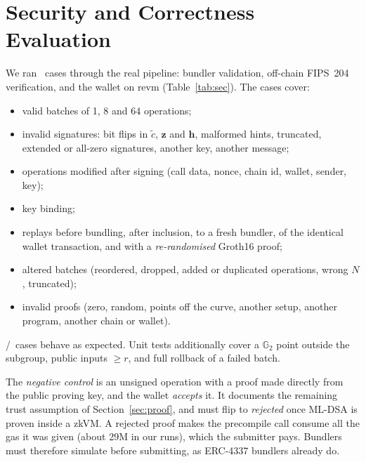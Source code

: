 \documentclass[conference]{IEEEtran}
\begin{document}
\begin{table}[t]
\centering
\caption{Net saving per operation (USD) of a sound zkVM proof at $N=\BatchMaxN$ vs.\ the executed optimised native verifier; prover at \ProverUsdHour\,USD/h (AWS g5.xlarge on-demand~\cite{aws2026g5pricing}). $t_{sig}$ is a parameter; 12.4\,s is the earlier draft's projection.}\label{tab:offchain}
\scriptsize

\end{table}

\section{Security and Correctness Evaluation}\label{sec:security}
We ran \SecCases\ cases through the real pipeline: bundler validation, off-chain FIPS~204 verification, and the wallet on revm (Table~\ref{tab:sec}). The cases cover:
\begin{itemize}
\item valid batches of 1, 8 and 64 operations;
\item invalid signatures: bit flips in $\tilde c$, $\mathbf z$ and $\mathbf h$, malformed hints, truncated, extended or all-zero signatures, another key, another message;
\item operations modified after signing (call data, nonce, chain id, wallet, sender, key);
\item key binding;
\item replays before bundling, after inclusion, to a fresh bundler, of the identical wallet transaction, and with a \emph{re-randomised} Groth16 proof;
\item altered batches (reordered, dropped, added or duplicated operations, wrong $N$, truncated);
\item invalid proofs (zero, random, points off the curve, another setup, another program, another chain or wallet).
\end{itemize}
\SecPass/\SecCases\ cases behave as expected. Unit tests additionally cover a $\mathbb{G}_2$ point outside the subgroup, public inputs $\ge r$, and full rollback of a failed batch.

The \emph{negative control} is an unsigned operation with a proof made directly from the public proving key, and the wallet \emph{accepts} it. It documents the remaining trust assumption of Section~\ref{sec:proof}, and must flip to \emph{rejected} once ML-DSA is proven inside a zkVM. A rejected proof makes the precompile call consume all the gas it was given (about 29M in our runs), which the submitter pays. Bundlers must therefore simulate before submitting, as ERC-4337 bundlers already do.
\end{document}
